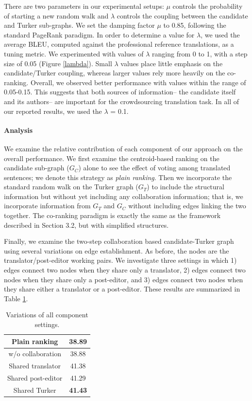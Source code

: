 \documentclass[11pt]{article}
\begin{document}
There are two parameters in our experimental setups: $\mu$ controls the probability of starting a new random walk and $\lambda$ controls the coupling between the candidate and Turker sub-graphs. We set the damping factor $\mu$ to 0.85, following the standard PageRank paradigm. In order to determine a value for $\lambda$, we used the average BLEU, computed against the professional reference translations, as a tuning metric. We experimented with values of $\lambda$ ranging from 0 to 1, with a step size of 0.05 (Figure \ref{lambda}). Small $\lambda$ values place little emphasis on the candidate/Turker coupling, whereas larger values rely more heavily on the co-ranking. Overall, we observed better performance with values within the range of 0.05-0.15. This suggests that both sources of information-- the candidate itself and its authors-- are important for the crowdsourcing translation task. In all of our reported results, we used the $\lambda$ = 0.1.

\paragraph{Analysis}
We examine the relative contribution of each component of our approach on the overall performance. We first examine the centroid-based ranking on the candidate sub-graph ($G_C$) alone to see the effect of voting among translated sentences; we denote this strategy as \textit{plain ranking}. Then we incorporate the standard random walk on the Turker graph ($G_T$) to include the structural information but without yet including any collaboration information; that is, we incorporate information from $G_T$ and $G_C$ without including edges linking the two together. The co-ranking paradigm is exactly the same as the framework described in Section 3.2, but with simplified structures.

Finally, we examine the two-step collaboration based candidate-Turker graph using several variations on edge establishment. As before, the nodes are the translator/post-editor working pairs. We investigate three settings in which 1) edges connect two nodes when they share only a translator, 2) edges connect two nodes when they share only a post-editor, and 3) edges connect two nodes when they share either a translator or a post-editor. These results are summarized in Table \ref{component-variation}.

\begin{table}[t]
\centering
\begin{tabular}{|c||c|} \hline
Plain ranking   &38.89        \\   \hline \hline
w/o collaboration &38.88  	           \\ \hline \hline
Shared translator  &41.38	          \\  \hline
Shared post-editor    &41.29 \\ \hline
Shared Turker   &\textbf{41.43}  \\  \hline
\end{tabular}
\caption{Variations of all component settings.}
\label{component-variation}
\end{table}
\end{document}
